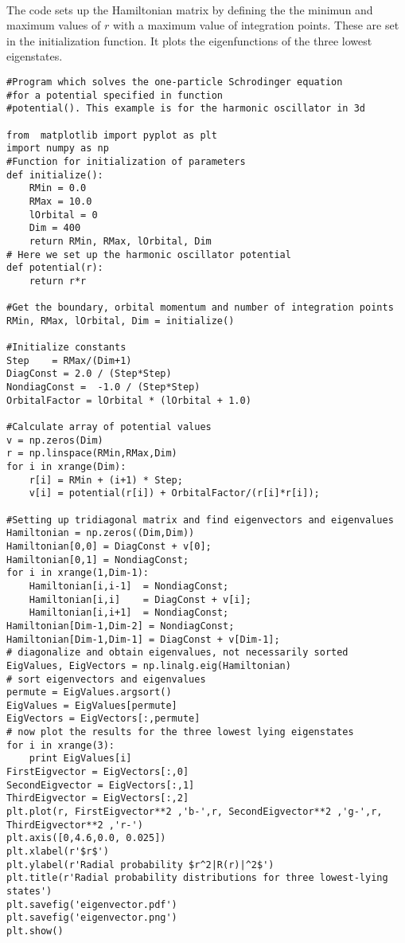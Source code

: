 \documentclass[%
twoside,                 %
final,                   %
10pt]{article}
\begin{document}
\paragraph{}
The code sets up the Hamiltonian matrix by defining the the minimun and maximum values of $r$ with a
maximum value of integration points.  These are set in the initialization function. It plots the 
eigenfunctions of the three lowest eigenstates.
\begin{verbatim}
#Program which solves the one-particle Schrodinger equation 
#for a potential specified in function
#potential(). This example is for the harmonic oscillator in 3d

from  matplotlib import pyplot as plt
import numpy as np
#Function for initialization of parameters
def initialize():
    RMin = 0.0
    RMax = 10.0
    lOrbital = 0
    Dim = 400
    return RMin, RMax, lOrbital, Dim
# Here we set up the harmonic oscillator potential
def potential(r):
    return r*r

#Get the boundary, orbital momentum and number of integration points
RMin, RMax, lOrbital, Dim = initialize()

#Initialize constants
Step    = RMax/(Dim+1)
DiagConst = 2.0 / (Step*Step)
NondiagConst =  -1.0 / (Step*Step)
OrbitalFactor = lOrbital * (lOrbital + 1.0)

#Calculate array of potential values
v = np.zeros(Dim)
r = np.linspace(RMin,RMax,Dim)
for i in xrange(Dim):
    r[i] = RMin + (i+1) * Step;
    v[i] = potential(r[i]) + OrbitalFactor/(r[i]*r[i]);

#Setting up tridiagonal matrix and find eigenvectors and eigenvalues
Hamiltonian = np.zeros((Dim,Dim))
Hamiltonian[0,0] = DiagConst + v[0];
Hamiltonian[0,1] = NondiagConst;
for i in xrange(1,Dim-1):
    Hamiltonian[i,i-1]  = NondiagConst;
    Hamiltonian[i,i]    = DiagConst + v[i];
    Hamiltonian[i,i+1]  = NondiagConst;
Hamiltonian[Dim-1,Dim-2] = NondiagConst;
Hamiltonian[Dim-1,Dim-1] = DiagConst + v[Dim-1];
# diagonalize and obtain eigenvalues, not necessarily sorted
EigValues, EigVectors = np.linalg.eig(Hamiltonian)
# sort eigenvectors and eigenvalues
permute = EigValues.argsort()
EigValues = EigValues[permute]
EigVectors = EigVectors[:,permute]
# now plot the results for the three lowest lying eigenstates
for i in xrange(3):
    print EigValues[i]
FirstEigvector = EigVectors[:,0]
SecondEigvector = EigVectors[:,1]
ThirdEigvector = EigVectors[:,2]
plt.plot(r, FirstEigvector**2 ,'b-',r, SecondEigvector**2 ,'g-',r, ThirdEigvector**2 ,'r-')
plt.axis([0,4.6,0.0, 0.025])
plt.xlabel(r'$r$')
plt.ylabel(r'Radial probability $r^2|R(r)|^2$')
plt.title(r'Radial probability distributions for three lowest-lying states')
plt.savefig('eigenvector.pdf')
plt.savefig('eigenvector.png')
plt.show()

\end{verbatim}
\end{document}
